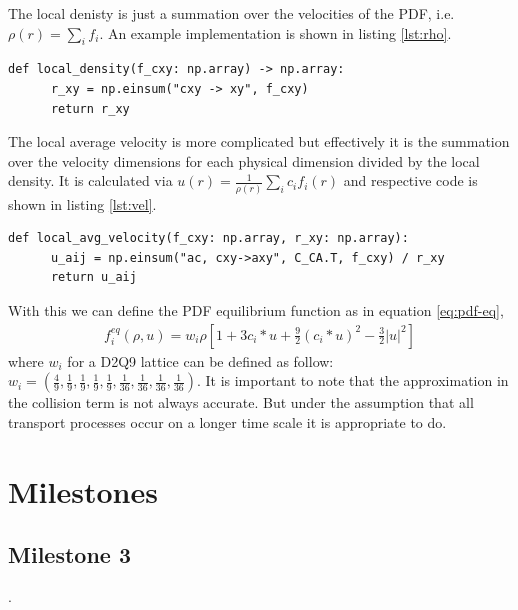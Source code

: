 \documentclass[a4paper,11pt]{article}
\begin{document}
The local denisty is just a summation over the velocities of the PDF, i.e. $\rho(r) = \sum_{i} f_{i}$.
An example implementation is shown in listing \ref{lst:rho}.
\begin{center}
  \begin{lstlisting}[caption=Implementation of the local density,label=lst:rho, basicstyle=\small]
    def local_density(f_cxy: np.array) -> np.array:
      r_xy = np.einsum("cxy -> xy", f_cxy)
      return r_xy
  \end{lstlisting}
\end{center}
The local average velocity is more complicated but effectively it is the summation over the velocity dimensions for each physical dimension divided by the local density.
It is calculated via $u(r)=\frac{1}{\rho (r)} \sum_{i} c_{i}f_{i}(r)$ and respective code is shown in listing \ref{lst:vel}.
\begin{center}
  \begin{lstlisting}[caption=Implementation of the local average velocity.,label=lst:vel, basicstyle=\small]
    def local_avg_velocity(f_cxy: np.array, r_xy: np.array):
      u_aij = np.einsum("ac, cxy->axy", C_CA.T, f_cxy) / r_xy
      return u_aij
  \end{lstlisting}
\end{center}
With this we can define the PDF equilibrium function as in equation \ref{eq:pdf-eq},
\begin{equation}
  \label{eq:pdf-eq}
  \begin{aligned}
    f_{i}^{eq} ( \rho , u ) = w_i \rho \left[ 1+3 c_i * u + \frac{9}{2}(c_i * u )^2 - \frac{3}{2} | u |^2 \right]
  \end{aligned}
\end{equation}
where $w_i$ for a D2Q9 lattice can be defined as follow: $w_i = \left( \frac{4}{9}, \frac{1}{9}, \frac{1}{9}, \frac{1}{9}, \frac{1}{9}, \frac{1}{36}, \frac{1}{36}, \frac{1}{36}, \frac{1}{36} \right)$.
It is important to note that the approximation in the collision term is not always accurate.
But under the assumption that all transport processes occur on a longer time scale it is appropriate to do.

\section{Milestones}
\subsection{Milestone 3}



.





% 
\end{document}
